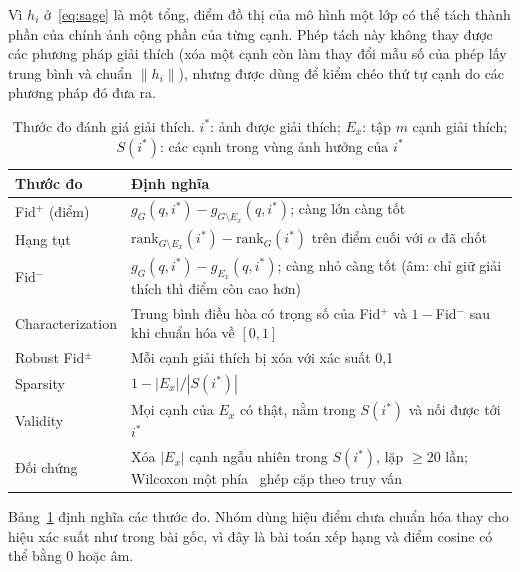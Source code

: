 Vì $h_i$ ở~\eqref{eq:sage} là một tổng, điểm đồ thị của mô hình một lớp có thể tách thành phần của chính ảnh cộng phần của từng cạnh. Phép tách này không thay được các phương pháp giải thích (xóa một cạnh còn làm thay đổi mẫu số của phép lấy trung bình và chuẩn $\|h_i\|$), nhưng được dùng để kiểm chéo thứ tự cạnh do các phương pháp đó đưa ra.

\begin{table}[t]
\centering
\caption{Thước đo đánh giá giải thích. $i^*$: ảnh được giải thích; $E_x$: tập $m$ cạnh giải thích; $S(i^*)$: các cạnh trong vùng ảnh hưởng của $i^*$}
\label{tab:metrics}
\footnotesize
\setlength{\tabcolsep}{3pt}
\begin{tabular}{@{}p{1.95cm}p{5.55cm}@{}}
\toprule
\textbf{Thước đo} & \textbf{Định nghĩa} \\
\midrule
Fid$^+$ (điểm) & $g_G(q,i^*) - g_{G\setminus E_x}(q,i^*)$; càng lớn càng tốt \\
Hạng tụt & $\text{rank}_{G\setminus E_x}(i^*) - \text{rank}_G(i^*)$ trên điểm cuối với $\alpha$ đã chốt \\
Fid$^-$ & $g_G(q,i^*) - g_{E_x}(q,i^*)$; càng nhỏ càng tốt (âm: chỉ giữ giải thích thì điểm còn cao hơn) \\
Characterization & Trung bình điều hòa có trọng số của Fid$^+$ và $1-$Fid$^-$ sau khi chuẩn hóa về $[0,1]$~\cite{amara2022graphframex} \\
Robust Fid$^\pm$ & Mỗi cạnh giải thích bị xóa với xác suất 0,1~\cite{zheng2024robust} \\
Sparsity & $1 - |E_x|/|S(i^*)|$ \\
Validity & Mọi cạnh của $E_x$ có thật, nằm trong $S(i^*)$ và nối được tới $i^*$ \\
Đối chứng & Xóa $|E_x|$ cạnh ngẫu nhiên trong $S(i^*)$, lặp $\ge 20$ lần; Wilcoxon một phía~\cite{wilcoxon1945} ghép cặp theo truy vấn \\
\bottomrule
\end{tabular}
\end{table}

Bảng~\ref{tab:metrics} định nghĩa các thước đo. Nhóm dùng hiệu điểm chưa chuẩn hóa thay cho hiệu xác suất như trong bài gốc, vì đây là bài toán xếp hạng và điểm cosine có thể bằng 0 hoặc âm.
